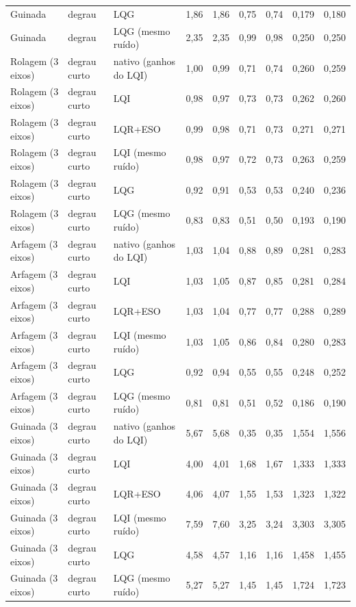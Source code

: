 \begin{longtable}{lllrrrrrr}
Guinada & degrau & LQG & 1,86 & 1,86 & 0,75 & 0,74 & 0,179 & 0,180 \\
Guinada & degrau & LQG (mesmo ruído) & 2,35 & 2,35 & 0,99 & 0,98 & 0,250 & 0,250 \\
Rolagem (3 eixos) & degrau curto & nativo (ganhos do LQI) & 1,00 & 0,99 & 0,71 & 0,74 & 0,260 & 0,259 \\
Rolagem (3 eixos) & degrau curto & LQI & 0,98 & 0,97 & 0,73 & 0,73 & 0,262 & 0,260 \\
Rolagem (3 eixos) & degrau curto & LQR+ESO & 0,99 & 0,98 & 0,71 & 0,73 & 0,271 & 0,271 \\
Rolagem (3 eixos) & degrau curto & LQI (mesmo ruído) & 0,98 & 0,97 & 0,72 & 0,73 & 0,263 & 0,259 \\
Rolagem (3 eixos) & degrau curto & LQG & 0,92 & 0,91 & 0,53 & 0,53 & 0,240 & 0,236 \\
Rolagem (3 eixos) & degrau curto & LQG (mesmo ruído) & 0,83 & 0,83 & 0,51 & 0,50 & 0,193 & 0,190 \\
Arfagem (3 eixos) & degrau curto & nativo (ganhos do LQI) & 1,03 & 1,04 & 0,88 & 0,89 & 0,281 & 0,283 \\
Arfagem (3 eixos) & degrau curto & LQI & 1,03 & 1,05 & 0,87 & 0,85 & 0,281 & 0,284 \\
Arfagem (3 eixos) & degrau curto & LQR+ESO & 1,03 & 1,04 & 0,77 & 0,77 & 0,288 & 0,289 \\
Arfagem (3 eixos) & degrau curto & LQI (mesmo ruído) & 1,03 & 1,05 & 0,86 & 0,84 & 0,280 & 0,283 \\
Arfagem (3 eixos) & degrau curto & LQG & 0,92 & 0,94 & 0,55 & 0,55 & 0,248 & 0,252 \\
Arfagem (3 eixos) & degrau curto & LQG (mesmo ruído) & 0,81 & 0,81 & 0,51 & 0,52 & 0,186 & 0,190 \\
Guinada (3 eixos) & degrau curto & nativo (ganhos do LQI) & 5,67 & 5,68 & 0,35 & 0,35 & 1,554 & 1,556 \\
Guinada (3 eixos) & degrau curto & LQI & 4,00 & 4,01 & 1,68 & 1,67 & 1,333 & 1,333 \\
Guinada (3 eixos) & degrau curto & LQR+ESO & 4,06 & 4,07 & 1,55 & 1,53 & 1,323 & 1,322 \\
Guinada (3 eixos) & degrau curto & LQI (mesmo ruído) & 7,59 & 7,60 & 3,25 & 3,24 & 3,303 & 3,305 \\
Guinada (3 eixos) & degrau curto & LQG & 4,58 & 4,57 & 1,16 & 1,16 & 1,458 & 1,455 \\
Guinada (3 eixos) & degrau curto & LQG (mesmo ruído) & 5,27 & 5,27 & 1,45 & 1,45 & 1,724 & 1,723 \\

\end{longtable}
